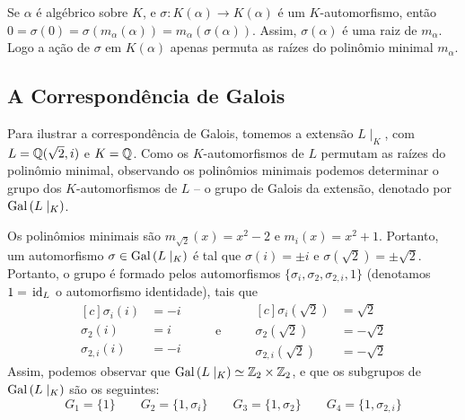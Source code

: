 Se $\alpha$ é algébrico sobre $K$, e $\sigma:K(\alpha) \rightarrow K(\alpha)$ é um $K$-automorfismo, então $0=\sigma(0)=\sigma(m_\alpha(\alpha))=m_\alpha(\sigma(\alpha))$. Assim, $\sigma(\alpha)$ é uma raiz de $m_\alpha$. Logo a ação de $\sigma$ em $K(\alpha)$ apenas permuta as raízes do polinômio minimal $m_\alpha$.
\subsection{A Correspondência de Galois}
Para ilustrar a correspondência de Galois, tomemos a extensão $L\mid_K$, com $L=\mathbb{Q}(\sqrt{2},i)$ e $K=\mathbb{Q}$. Como os $K$-automorfismos de $L$ permutam as raízes do polinômio minimal, observando os polinômios minimais podemos determinar o grupo dos $K$-automorfismos de $L$ -- o grupo de Galois da extensão, denotado por $\textrm{Gal}\left({L}\mid_{K}\right)$.

Os polinômios minimais são $m_{\sqrt{2}}(x)= x^2-2$ e $m_i(x)=x^2+1$. Portanto, um automorfismo $\sigma\in \textrm{Gal}\left({L}\mid_{K}\right)$ é tal que $\sigma(i)=\pm i$ e $\sigma(\sqrt{2})=\pm \sqrt{2}$. Portanto, o grupo é formado pelos automorfismos $\{\sigma_{i}, \sigma_{2}, \sigma_{2,i}, 1\}$ (denotamos $1= \, \textrm{id}_{L}$ o automorfismo identidade), tais que
\begin{equation*}
\begin{aligned}[c]
\sigma_i(i) &= -i\\
\sigma_2(i) &= i\\
\sigma_{2,i}(i) &= -i
\end{aligned}
\qquad\textrm{ e }\qquad
\begin{aligned}[c]
\sigma_i(\sqrt{2}) &= \sqrt{2}\\
\sigma_2(\sqrt{2}) &= -\sqrt{2}\\
\sigma_{2,i}(\sqrt{2}) &= -\sqrt{2}
\end{aligned}
\end{equation*}
Assim, podemos observar que $\textrm{Gal}\left({L}\mid_{K}\right) \simeq \mathbb{Z}_2 \times \mathbb{Z}_2$, e que os subgrupos de $\textrm{Gal}\left({L}\mid_{K}\right)$ são os seguintes:
\[G_1 = \{1\} \qquad G_2 = \{1, \sigma_i\} \qquad G_3 = \{1, \sigma_2\} \qquad G_4 = \{1, \sigma_{2,i}\}\]

